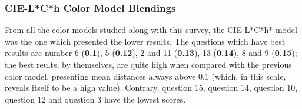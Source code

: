 \subsubsection{CIE-L*C*h Color Model Blendings}
\label{subsubsec:lchcolormodel}
%
From all the color models studied along with this survey, the CIE-L*C*h* model was the one which presented the lower results. The questions which have best results are number 6 (\textbf{0.1}), 5 (\textbf{0.12}), 2 and 11 (\textbf{0.13}), 13 (\textbf{0.14}), 8 and 9 (\textbf{0.15});
the best reults, by themselves, are quite high when compared with the previous color model, presenting mean distances always above 0.1 (which, in this scale, reveals itself to be a high value). Contrary, question 15, question 14,
question 10, question 12 and question 3 have the lowest scores. \par
%
